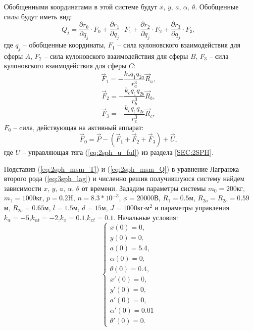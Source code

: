 Обобщенными координатами в этой системе будут $x$, $y$, $a$, $\alpha$, $\theta$.
Обобщенные силы будут иметь вид:
\begin{equation}
\label{eq:2sph_msm_Q}
	Q_j = \frac{\partial r_0}{\partial q_j} \cdot F_0 + \frac{\partial r_1}{\partial q_j} \cdot F_1 +\frac{\partial r_2}{\partial q_j} \cdot F_2 +\frac{\partial r_3}{\partial q_j} \cdot F_3,
\end{equation}
где $q_j$ – обобщенные координаты, $F_1$ – сила кулоновского взаимодействия для сферы $A$, $F_2$ – сила кулоновского взаимодействия для сферы $B$, $F_3$ – сила кулоновского взаимодействия для сферы $C$:
\begin{equation}
\label{eq:2sph_msm_f1}
	\vec{F}_1 = -\frac{k_c q_1 q_{2a}}{r_a^3}\vec{R}_a,
\end{equation}
\begin{equation}
\label{eq:2sph_msm_f2}
	\vec{F}_2 = -\frac{k_c q_1 q_{2b}}{r_b^3}\vec{R}_b,
\end{equation}
\begin{equation}
\label{eq:2sph_msm_f3}
	\vec{F}_3 = -\frac{k_c q_1 q_{2c}}{r_c^3}\vec{R}_c,
\end{equation}
$F_0$ – cила, действующая на активный аппарат:
\begin{equation}
\label{eq:2sph_msm_f0_u}
	\vec{F}_0 = \vec{P} - (\vec{F}_1 + \vec{F}_2 + \vec{F}_3) + \vec{U},
\end{equation}
где $U$ – управляющая тяга (\ref{eq:2sph_u_ful}) из раздела \ref{SEC:2SPH}.

Подставив (\ref{eq:2sph_msm_T}) и (\ref{eq:2sph_msm_Q}) в уравнение Лагранжа второго рода (\ref{eq:3sph_lag}) и численно решив получившуюся систему найдем зависимости $x$, $y$, $a$, $\alpha$, $\theta$ от времени.
Зададим параметры системы $m_0 = 200$кг, $m_1=1000$кг, $p=0.2$H, $n=8.3 * 10^{-3}$, $\phi = 20000$В, $R_1 = 0.5$м, $R_{2a} = R_{2c} = 0.59$м, $R_{2b} = 0.65$м, $l = 1.5$м, $d = 15$м, $J = 1000$кг$\cdot$м${}^2$ и параметры управления $k_\alpha = -5$,$k_{\alpha t} = -2$,$k_x = 0.1$,$k_{x t} = 0.1$.
Начальные условия:
\begin{equation}
	\begin{cases}
		x(0) = 0, \\
		y(0) = 0, \\
		a(0) = 5.4, \\
		\alpha(0) = 0,\\
		\theta(0) = 0.4,\\
		x'(0) = 0, \\
		y'(0) = 0, \\
		a'(0) = 0, \\
		\alpha'(0) = 0.01\\
		\theta'(0) = 0.
	\end{cases}
\end{equation}

